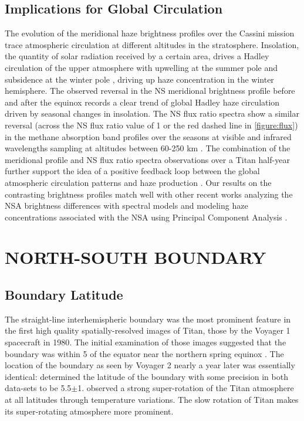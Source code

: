 \documentclass[apj,tighten]{emulateapj}
\begin{document}
\subsection{Implications for Global Circulation}
The evolution of the meridional haze brightness profiles over the Cassini mission trace atmospheric circulation at different altitudes in the stratosphere.
Insolation, the quantity of solar radiation received by a certain area, drives a Hadley circulation of the upper atmosphere with upwelling at the summer pole and subsidence at the winter pole \citep{tokano2007near,lebonnois2014general}, driving up haze concentration in the winter hemisphere.
The observed reversal in the NS meridional brightness profile before and after the equinox records a clear trend of global Hadley haze circulation driven by seasonal changes in insolation.
The NS flux ratio spectra show a similar reversal (across the NS flux ratio value of 1 or the red dashed line in \autoref{figure:flux}) in the methane absorption band profiles over the seasons at visible and infrared wavelengths sampling at altitudes between 60-250 km \cite{robinson2014titan}.
The combination of the meridional profile and NS flux ratio spectra observations over a Titan half-year further support the idea of a positive feedback loop between the global atmospheric circulation patterns and haze production \cite{rannou2002wind}. 
Our results on the contrasting brightness profiles match well with other recent works analyzing the NSA brightness differences with spectral models \cite{kutsop2022titan} and modeling haze concentrations associated with the NSA using Principal Component Analysis \citep{karkoschka2022titan}.


\section{NORTH-SOUTH BOUNDARY}

\subsection{Boundary Latitude}


The straight-line interhemispheric boundary was the most prominent feature in the first high quality spatially-resolved images of Titan, those by the Voyager 1 spacecraft in 1980.
The initial examination of those images suggested that the boundary was within 5\degree{} of the equator near the northern spring equinox \citep{smith1981encounter}.
The location of the boundary as seen by Voyager 2 nearly a year later was essentially identical: \cite{squyres1984voyager} determined the latitude of the boundary with some precision in both data-sets to be 5.5\degree{}$\pm$1.
\cite{flasar1981titan} observed a strong super-rotation of the Titan atmosphere at all latitudes through temperature variations.
The slow rotation of Titan makes its super-rotating atmosphere more prominent. 
\end{document}
